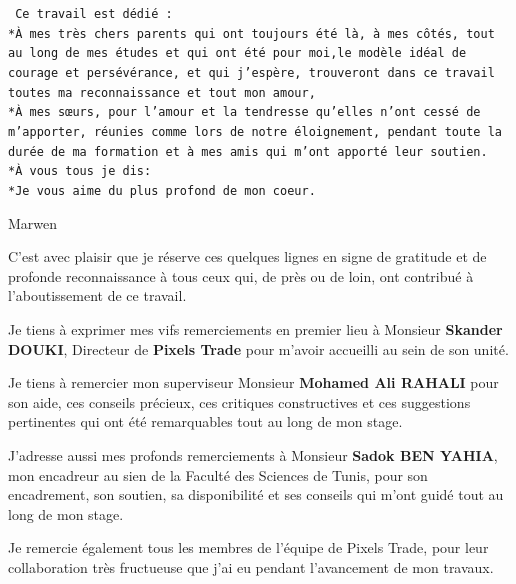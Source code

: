 \documentclass[12pt, ChapStyle1, oneside]{./Styles/Dea_Gsm}
\begin{document}
\vspace{8mm}
\Large
\begin{center}
\texttt{
Ce travail est dédié :
\vspace{6mm}
\\*À mes très chers parents qui ont toujours
été là, à mes côtés, tout au long de mes études et qui ont été pour moi,le modèle idéal de courage et persévérance, et qui j'espère, trouveront dans ce travail toutes ma reconnaissance et tout mon amour,
\\*À mes sœurs, pour l'amour et la tendresse qu'elles n'ont cessé de m'apporter, réunies comme lors de notre éloignement, pendant toute la durée de ma formation et à mes amis qui m'ont apporté leur soutien.
\\*À vous tous je dis:
\\*Je vous aime du plus profond de mon coeur.}
\end{center}
\vspace{6mm}
\begin{flushright}
\Large Marwen
\end{flushright}

\large
C'est avec plaisir que je réserve ces quelques lignes en signe de gratitude et de profonde reconnaissance à tous ceux qui, de près ou de loin, ont contribué à l'aboutissement de ce travail.

\vspace{4mm}
Je tiens à exprimer mes vifs remerciements en premier lieu à Monsieur\textbf{ Skander DOUKI}, Directeur de \textbf{Pixels Trade} pour m'avoir accueilli au sein de son unité.

\vspace{4mm}
Je tiens à remercier mon superviseur Monsieur \textbf{Mohamed Ali RAHALI} pour son aide, ces conseils précieux, ces critiques constructives et ces suggestions pertinentes qui ont été remarquables tout au long de mon stage.

\vspace{4mm}
J'adresse aussi mes profonds remerciements à Monsieur \textbf{Sadok BEN YAHIA}, mon encadreur au sien de la Faculté des Sciences de Tunis, pour son encadrement, son soutien, sa disponibilité et ses conseils qui m'ont guidé tout au long de mon stage.

\vspace{4mm}
Je remercie également tous les membres de l'équipe de Pixels Trade, pour leur collaboration très fructueuse que j'ai eu pendant l'avancement de mon travaux.
\end{document}
